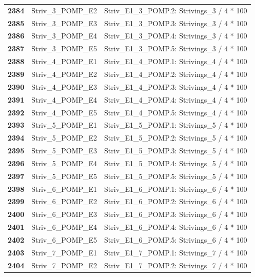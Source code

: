 \documentclass[
  letterpaper,
  DIV=11,
  numbers=noendperiod]{scrartcl}
\begin{document}
\begin{longtable}[t]{>{}cll}
\textbf{2384} & Striv\_3\_POMP\_E2 & Striv\_E1\_3\_POMP.2: Strivings\_3 / 4 * 100\\
\textbf{2385} & Striv\_3\_POMP\_E3 & Striv\_E1\_3\_POMP.3: Strivings\_3 / 4 * 100\\
\addlinespace
\textbf{2386} & Striv\_3\_POMP\_E4 & Striv\_E1\_3\_POMP.4: Strivings\_3 / 4 * 100\\
\textbf{2387} & Striv\_3\_POMP\_E5 & Striv\_E1\_3\_POMP.5: Strivings\_3 / 4 * 100\\
\textbf{2388} & Striv\_4\_POMP\_E1 & Striv\_E1\_4\_POMP.1: Strivings\_4 / 4 * 100\\
\textbf{2389} & Striv\_4\_POMP\_E2 & Striv\_E1\_4\_POMP.2: Strivings\_4 / 4 * 100\\
\textbf{2390} & Striv\_4\_POMP\_E3 & Striv\_E1\_4\_POMP.3: Strivings\_4 / 4 * 100\\
\addlinespace
\textbf{2391} & Striv\_4\_POMP\_E4 & Striv\_E1\_4\_POMP.4: Strivings\_4 / 4 * 100\\
\textbf{2392} & Striv\_4\_POMP\_E5 & Striv\_E1\_4\_POMP.5: Strivings\_4 / 4 * 100\\
\textbf{2393} & Striv\_5\_POMP\_E1 & Striv\_E1\_5\_POMP.1: Strivings\_5 / 4 * 100\\
\textbf{2394} & Striv\_5\_POMP\_E2 & Striv\_E1\_5\_POMP.2: Strivings\_5 / 4 * 100\\
\textbf{2395} & Striv\_5\_POMP\_E3 & Striv\_E1\_5\_POMP.3: Strivings\_5 / 4 * 100\\
\addlinespace
\textbf{2396} & Striv\_5\_POMP\_E4 & Striv\_E1\_5\_POMP.4: Strivings\_5 / 4 * 100\\
\textbf{2397} & Striv\_5\_POMP\_E5 & Striv\_E1\_5\_POMP.5: Strivings\_5 / 4 * 100\\
\textbf{2398} & Striv\_6\_POMP\_E1 & Striv\_E1\_6\_POMP.1: Strivings\_6 / 4 * 100\\
\textbf{2399} & Striv\_6\_POMP\_E2 & Striv\_E1\_6\_POMP.2: Strivings\_6 / 4 * 100\\
\textbf{2400} & Striv\_6\_POMP\_E3 & Striv\_E1\_6\_POMP.3: Strivings\_6 / 4 * 100\\
\addlinespace
\textbf{2401} & Striv\_6\_POMP\_E4 & Striv\_E1\_6\_POMP.4: Strivings\_6 / 4 * 100\\
\textbf{2402} & Striv\_6\_POMP\_E5 & Striv\_E1\_6\_POMP.5: Strivings\_6 / 4 * 100\\
\textbf{2403} & Striv\_7\_POMP\_E1 & Striv\_E1\_7\_POMP.1: Strivings\_7 / 4 * 100\\
\textbf{2404} & Striv\_7\_POMP\_E2 & Striv\_E1\_7\_POMP.2: Strivings\_7 / 4 * 100\\

\end{longtable}
\end{document}
